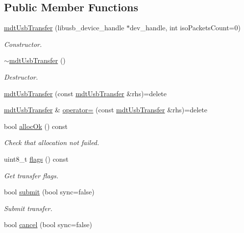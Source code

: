 \subsection*{Public Member Functions}
\begin{DoxyCompactItemize}
\item 
\hyperlink{classmdt_usb_transfer_aeb33fa86faaab99b0b5f276845817bdf}{mdt\-Usb\-Transfer} (libusb\-\_\-device\-\_\-handle $\ast$dev\-\_\-handle, int iso\-Packets\-Count=0)
\begin{DoxyCompactList}\small\item\em Constructor. \end{DoxyCompactList}\item 
\hyperlink{classmdt_usb_transfer_acc8f5954658622fbdee4693ff31f530e}{$\sim$mdt\-Usb\-Transfer} ()
\begin{DoxyCompactList}\small\item\em Destructor. \end{DoxyCompactList}\item 
\hyperlink{classmdt_usb_transfer_a2c58e8fc7d6186d2b64a8e3d5460da6e}{mdt\-Usb\-Transfer} (const \hyperlink{classmdt_usb_transfer}{mdt\-Usb\-Transfer} \&rhs)=delete
\item 
\hyperlink{classmdt_usb_transfer}{mdt\-Usb\-Transfer} \& \hyperlink{classmdt_usb_transfer_a9fbfd9b44ae5317c2a6a7569f7c15aa5}{operator=} (const \hyperlink{classmdt_usb_transfer}{mdt\-Usb\-Transfer} \&rhs)=delete
\item 
bool \hyperlink{classmdt_usb_transfer_ad112791d6733fea376a9842444787912}{alloc\-Ok} () const 
\begin{DoxyCompactList}\small\item\em Check that allocation not failed. \end{DoxyCompactList}\item 
uint8\-\_\-t \hyperlink{classmdt_usb_transfer_ae49c0346db4f0fbd62bb0131e259330e}{flags} () const 
\begin{DoxyCompactList}\small\item\em Get transfer flags. \end{DoxyCompactList}\item 
bool \hyperlink{classmdt_usb_transfer_a8f8999f1c419f31c26b352cf6782a0d2}{submit} (bool sync=false)
\begin{DoxyCompactList}\small\item\em Submit transfer. \end{DoxyCompactList}\item 
bool \hyperlink{classmdt_usb_transfer_a06901e7438433d7b10b244bf853b2ab3}{cancel} (bool sync=false)

\end{DoxyCompactItemize}
